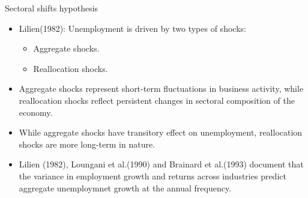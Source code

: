 \documentclass{beamer}
\begin{document}
\begin{frame}{Sectoral shifts hypothesis}
\begin{itemize}
    \item {Lilien(1982): Unemployment is driven by two types of shocks:}
    \begin{itemize}
        \item {Aggregate shocks.}
        \item {Reallocation shocks.}
    \end{itemize}
    \item {Aggregate shocks represent short-term fluctuations in business activity, while reallocation shocks reflect persistent changes in sectoral composition of the economy.}
    \item {While aggregate shocks have transitory effect on unemployment, reallocation shocks are more long-term in nature.}
    \item {Lilien (1982), Loungani et al.(1990) and Brainard et al.(1993) document that the variance in employment growth and returns across industries predict aggregate unemploymnet growth at the annual frequency.}
\end{itemize}
\end{frame}
\end{document}
